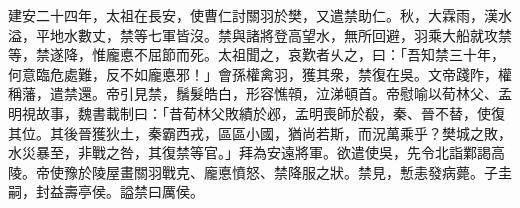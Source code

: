 \begin{pinyinscope}
建安二十四年，太祖在長安，使曹仁討關羽於樊，又遣禁助仁。秋，大霖雨，漢水溢，平地水數丈，禁等七軍皆沒。禁與諸將登高望水，無所回避，羽乘大船就攻禁等，禁遂降，惟龐悳不屈節而死。太祖聞之，哀歎者乆之，曰：「吾知禁三十年，何意臨危處難，反不如龐悳邪！」會孫權禽羽，獲其衆，禁復在吳。文帝踐阼，權稱藩，遣禁還。帝引見禁，鬚髮皓白，形容憔顇，泣涕頓首。帝慰喻以荀林父、孟明視故事，魏書載制曰：「昔荀林父敗績於邲，孟明喪師於殽，秦、晉不替，使復其位。其後晉獲狄土，秦霸西戎，區區小國，猶尚若斯，而況萬乘乎？樊城之敗，水災暴至，非戰之咎，其復禁等官。」拜為安遠將軍。欲遣使吳，先令北詣鄴謁高陵。帝使豫於陵屋畫關羽戰克、龐悳憤怒、禁降服之狀。禁見，慙恚發病薨。子圭嗣，封益壽亭侯。謚禁曰厲侯。


\end{pinyinscope}